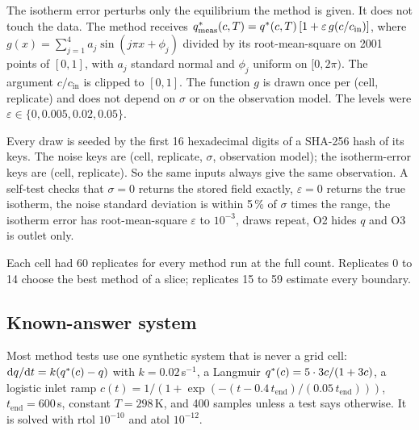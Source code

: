 The isotherm error perturbs only the equilibrium the method is given. It does not touch the
data. The method receives $q^{*}_{\mathrm{meas}}(c,T) = q^{*}(c,T)\,[1 + \varepsilon\,g(c/c_{\mathrm{in}})]$,
where $g(x) = \sum_{j=1}^{4} a_j \sin(j\pi x + \phi_j)$ divided by its root-mean-square on
2001 points of $[0,1]$, with $a_j$ standard normal and $\phi_j$ uniform on $[0, 2\pi)$. The
argument $c/c_{\mathrm{in}}$ is clipped to $[0,1]$. The function $g$ is drawn once per
(cell, replicate) and does not depend on $\sigma$ or on the observation model. The levels
were $\varepsilon \in \{0, 0.005, 0.02, 0.05\}$.

Every draw is seeded by the first 16 hexadecimal digits of a SHA-256 hash of its keys. The
noise keys are (cell, replicate, $\sigma$, observation model); the isotherm-error keys are
(cell, replicate). So the same inputs always give the same observation. A self-test checks
that $\sigma = 0$ returns the stored field exactly, $\varepsilon = 0$ returns the true
isotherm, the noise standard deviation is within 5\,\% of $\sigma$ times the range, the
isotherm error has root-mean-square $\varepsilon$ to $10^{-3}$, draws repeat, O2 hides $q$
and O3 is outlet only.

Each cell had 60 replicates for every method run at the full count. Replicates 0 to 14
choose the best method of a slice; replicates 15 to 59 estimate every boundary.

\subsection*{Known-answer system}
Most method tests use one synthetic system that is never a grid cell:
$\mathrm{d}q/\mathrm{d}t = k(q^{*}(c) - q)$ with $k = 0.02$\,s$^{-1}$, a Langmuir
$q^{*}(c) = 5 \cdot 3c/(1 + 3c)$, a logistic inlet ramp
$c(t) = 1/(1 + \exp(-(t - 0.4\,t_{\mathrm{end}})/(0.05\,t_{\mathrm{end}})))$,
$t_{\mathrm{end}} = 600$\,s, constant $T = 298$\,K, and 400 samples unless a test says
otherwise. It is solved with rtol $10^{-10}$ and atol $10^{-12}$.

